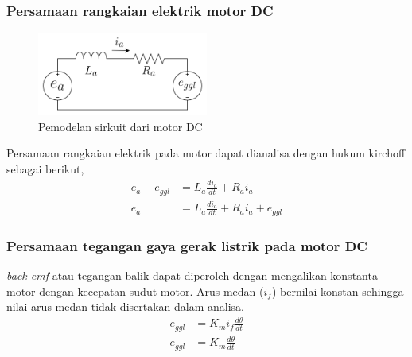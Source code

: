 \documentclass[../cover.tex]{subfiles}
\begin{document}
        \subsubsection{Persamaan rangkaian elektrik motor DC}
            \begin{figure}[H]
                \centering
                \includegraphics[width = 0.5\textwidth]{assets/image/pemodelan_sirkuit_motor.png}
                \caption{Pemodelan sirkuit dari motor DC}
                \label{gambar_4}
            \end{figure}
            Persamaan rangkaian elektrik pada motor dapat dianalisa dengan hukum kirchoff sebagai berikut,
            \begin{equation}
                \begin{split}
                    e_a - e_{ggl} &= L_a \frac{di_a}{dt} + R_a i_a \\[5pt]
                    e_a &= L_a \frac{di_a}{dt} + R_a i_a + e_{ggl}
                    \label{persamaan_10}
                \end{split}
            \end{equation}
        \subsubsection{Persamaan tegangan gaya gerak listrik pada motor DC}
        \textit{back emf} atau tegangan balik dapat diperoleh dengan mengalikan konstanta motor dengan kecepatan sudut motor. Arus medan ($i_f$) bernilai konstan sehingga nilai arus medan tidak disertakan dalam analisa.
            \begin{equation}
                \begin{split}
                    e_{ggl} &= K_m i_f \frac{d\theta}{dt} \\[5pt]
                    e_{ggl} &= K_m \frac{d\theta}{dt}
                    \label{persamaan_11}
                \end{split}
            \end{equation}
\end{document}
